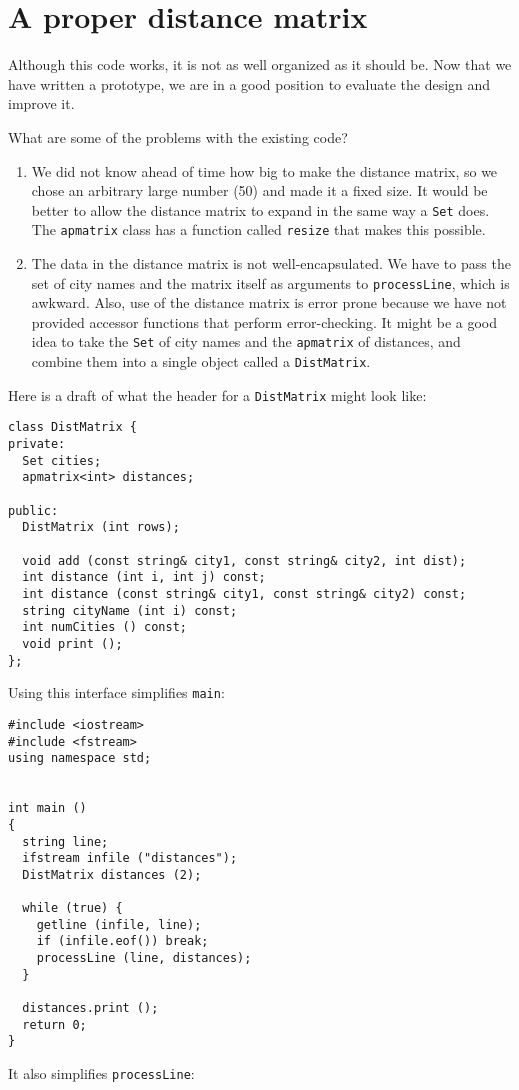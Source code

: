 \section{A proper distance matrix}

Although this code works, it is not as well organized as it
should be.  Now that we have written a prototype, we are in a
good position to evaluate the design and improve it.

What are some of the problems with the existing code?

\begin{enumerate}

\item We did not know ahead of time how big to make the distance
matrix, so we chose an arbitrary large number (50) and made it
a fixed size.  It would be better to allow the distance matrix
to expand in the same way a {\tt Set} does.  The {\tt apmatrix}
class has a function called {\tt resize} that makes this possible.


\item The data in the distance matrix is not well-encapsulated.
We have to pass the set of city names and the matrix itself
as arguments to {\tt processLine}, which is awkward.  Also,
use of the distance matrix is error prone because we have not
provided accessor functions that perform error-checking.
It might be a good idea to take the {\tt Set} of city names
and the {\tt apmatrix} of distances, and combine them into a
single object called a {\tt DistMatrix}.

\end{enumerate}

Here is a draft of what the header for a {\tt DistMatrix}
might look like:

\begin{verbatim}
class DistMatrix {
private:
  Set cities;
  apmatrix<int> distances;

public:
  DistMatrix (int rows);

  void add (const string& city1, const string& city2, int dist);
  int distance (int i, int j) const;
  int distance (const string& city1, const string& city2) const;
  string cityName (int i) const;
  int numCities () const;
  void print ();
};
\end{verbatim}
%
Using this interface simplifies {\tt main}:

\begin{verbatim}
#include <iostream>
#include <fstream>
using namespace std;


int main ()
{
  string line;
  ifstream infile ("distances");
  DistMatrix distances (2);

  while (true) {
    getline (infile, line);
    if (infile.eof()) break;
    processLine (line, distances);
  }

  distances.print ();
  return 0;
}
\end{verbatim}
%
It also simplifies {\tt processLine}:

